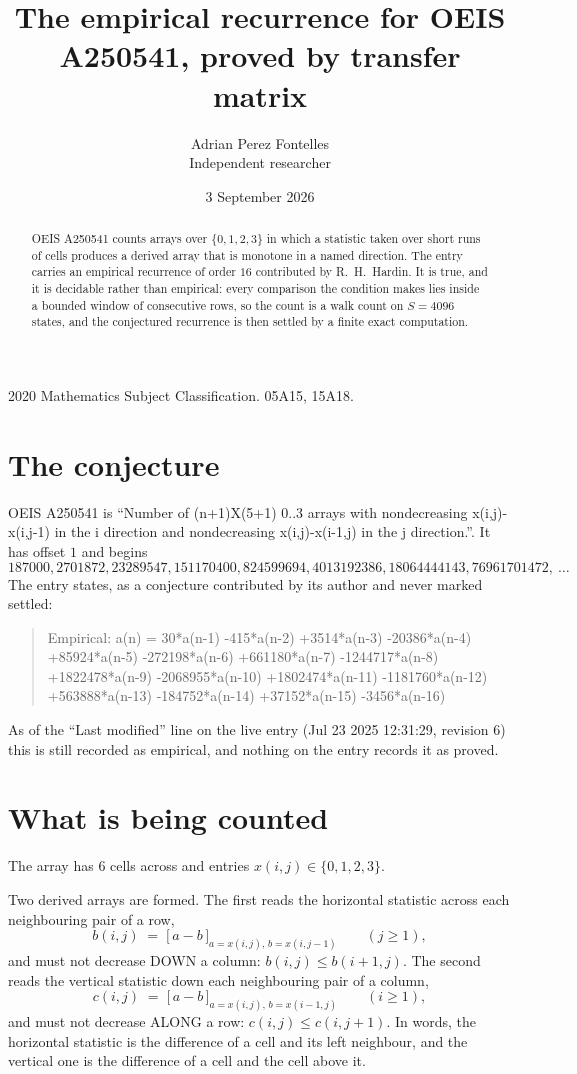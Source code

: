 \documentclass[11pt,a4paper]{article}
\title{The empirical recurrence for OEIS A250541, proved by transfer matrix}
\author{Adrian Perez Fontelles\\ \small Independent researcher}
\date{3 September 2026}
\theoremstyle{plain}
\theoremstyle{definition}
\begin{document}
\maketitle

\begin{abstract}
OEIS A250541 counts arrays over $\{0,1,2,3\}$ in which a statistic taken over short runs
of cells produces a derived array that is monotone in a named direction. The entry carries an
empirical recurrence of order $16$ contributed by R.~H.~Hardin. It is true, and it is
decidable rather than empirical: every comparison the condition makes lies inside a bounded
window of consecutive rows, so the count is a walk count on $S=4096$ states, and the
conjectured recurrence is then settled by a finite exact computation.
\end{abstract}

\noindent\small 2020 Mathematics Subject Classification. 05A15, 15A18.\normalsize

\section{The conjecture}

OEIS A250541 is ``Number of (n+1)X(5+1) 0..3 arrays with nondecreasing x(i,j)-x(i,j-1) in the i direction and nondecreasing x(i,j)-x(i-1,j) in the j direction.''. It has offset $1$ and begins
\[
187000, 2701872, 23289547, 151170400, 824599694, 4013192386, 18064444143, 76961701472,\ \dots
\]
The entry states, as a conjecture contributed by its author and never marked settled:
\begin{quote}
Empirical: a(n) = 30*a(n-1) -415*a(n-2) +3514*a(n-3) -20386*a(n-4) +85924*a(n-5) -272198*a(n-6) +661180*a(n-7) -1244717*a(n-8) +1822478*a(n-9) -2068955*a(n-10) +1802474*a(n-11) -1181760*a(n-12) +563888*a(n-13) -184752*a(n-14) +37152*a(n-15) -3456*a(n-16)
\end{quote}
As of the ``Last modified'' line on the live entry (Jul 23 2025 12:31:29, revision 6) this is still
recorded as empirical, and nothing on the entry records it as proved.

\section{What is being counted}

The array has $6$ cells across and entries $x(i,j)\in\{0,1,2,3\}$.

Two derived arrays are formed. The first reads the horizontal statistic across each
neighbouring pair of a row,
\[
b(i,j)\;=\;\bigl[\,a-b\,\bigr]_{a=x(i,j),\,b=x(i,j-1)}\qquad (j\ge1),
\]
and must not decrease DOWN a column: $b(i,j)\le b(i{+}1,j)$. The second reads the vertical
statistic down each neighbouring pair of a column,
\[
c(i,j)\;=\;\bigl[\,a-b\,\bigr]_{a=x(i,j),\,b=x(i{-}1,j)}\qquad (i\ge1),
\]
and must not decrease ALONG a row: $c(i,j)\le c(i,j{+}1)$. In words, the horizontal statistic
is the difference of a cell and its left neighbour, and the vertical one is
the difference of a cell and the cell above it.
\end{document}
